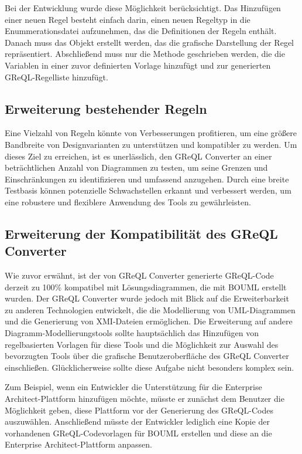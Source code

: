 Bei der Entwicklung wurde diese Möglichkeit berücksichtigt. Das Hinzufügen einer neuen Regel besteht einfach darin,
einen neuen Regeltyp in die Enummerationsdatei aufzunehmen, das die Definitionen der Regeln enthält. Danach muss das
Objekt erstellt werden, das die grafische Darstellung der Regel repräsentiert. Abschließend muss nur die Methode
geschrieben werden, die die Variablen in einer zuvor definierten Vorlage hinzufügt und zur generierten GReQL-Regelliste
hinzufügt.


\subsection{Erweiterung bestehender Regeln}

Eine Vielzahl von Regeln könnte von Verbesserungen profitieren, um eine größere Bandbreite von Designvarianten zu
unterstützen und kompatibler zu werden. Um dieses Ziel zu erreichen, ist es unerlässlich, den GReQL Converter an einer
beträchtlichen Anzahl von Diagrammen zu testen, um seine Grenzen und Einschränkungen zu identifizieren und umfassend
anzugehen. Durch eine breite Testbasis können potenzielle Schwachstellen erkannt und verbessert werden, um eine
robustere und flexiblere Anwendung des Tools zu gewährleisten.


\subsection{Erweiterung der Kompatibilität des GReQL Converter}

Wie zuvor erwähnt, ist der von GReQL Converter generierte GReQL-Code derzeit zu 100\% kompatibel mit Lösungsdiagrammen,
die mit BOUML erstellt wurden. Der GReQL Converter wurde jedoch mit Blick auf die Erweiterbarkeit zu anderen
Technologien entwickelt, die die Modellierung von UML-Diagrammen und die Generierung von XMI-Dateien ermöglichen. Die
Erweiterung auf andere Diagramm-Modellierungstools sollte hauptsächlich das Hinzufügen von regelbasierten Vorlagen für
diese Tools und die Möglichkeit zur Auswahl des bevorzugten Tools über die grafische Benutzeroberfläche des GReQL
Converter einschließen. Glücklicherweise sollte diese Aufgabe nicht besonders komplex sein.

Zum Beispiel, wenn ein Entwickler die Unterstützung für die Enterprise Architect-Plattform hinzufügen möchte, müsste er
zunächst dem Benutzer die Möglichkeit geben, diese Plattform vor der Generierung des GReQL-Codes auszuwählen.
Anschließend müsste der Entwickler lediglich eine Kopie der vorhandenen GReQL-Codevorlagen für BOUML erstellen und diese
an die Enterprise Architect-Plattform anpassen.


